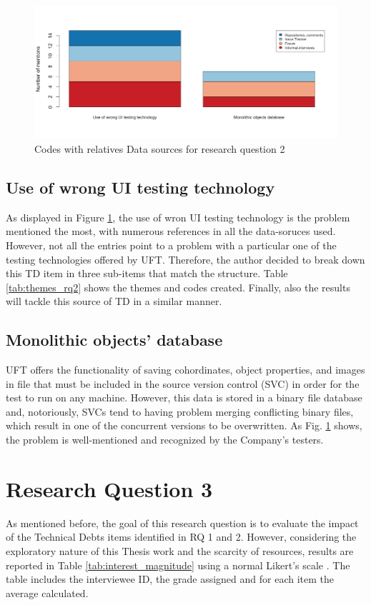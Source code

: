 \begin{figure}[!htbp]
    \centering
    \includegraphics[width=\textwidth,keepaspectratio]{figure/results/rq2/sources.png}
    \caption{Codes with relatives Data sources for research question 2}
    \label{fig:rq2_sources}
\end{figure}


\subsection{Use of wrong UI testing technology}
As displayed in Figure \ref{fig:rq2_sources}, the use of wron UI testing technology is the problem mentioned the most, with numerous references in all the data-soruces used. However, not all the entries point to a problem with a particular one of the testing technologies offered by UFT. Therefore, the author decided to break down this TD item in three sub-items that match the structure. Table \ref{tab:themes_rq2} shows the themes and codes created.
Finally, also the results will tackle this source of TD in a similar manner.


\subsection{Monolithic objects’ database}
UFT offers the functionality of saving cohordinates, object properties, and images in file that must be included in the source version control (SVC) in order for the test to run on any machine. However, this data is stored in a binary file database and, notoriously, SVCs tend to having problem merging conflicting binary files, which result in one of the concurrent versions to be overwritten. As Fig. \ref{fig:rq2_sources} shows, the problem is well-mentioned and recognized by the Company's testers.

\section{Research Question 3}
As mentioned before, the goal of this research question is to evaluate the impact of the Technical Debts items identified in RQ 1 and 2. However, considering the exploratory nature of this Thesis work and the scarcity of resources, results are reported in Table \ref{tab:interest_magnitude} using a normal Likert's scale \cite{likert-scale}. The table includes the interviewee ID, the grade assigned and for each item the average calculated.

